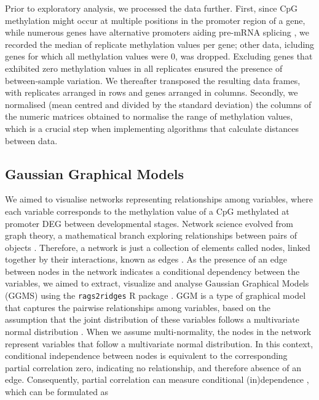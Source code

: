 \documentclass[
	a4paper, %
	10pt, %
	unnumberedsections, %
	twoside, %
]{LTJournalArticle}
\begin{document}
Prior to exploratory analysis, we processed the data further. 
First, since CpG methylation might occur at 
multiple positions in the promoter region of a gene, while numerous genes 
have alternative promoters aiding pre-mRNA splicing \autocite{xin2008a}, we 
recorded the median 
of replicate methylation values per gene; other data, icluding 
genes for which all methylation values were 0, was dropped. Excluding genes that 
exhibited zero methylation values in all replicates ensured the presence 
of between-sample variation. We thereafter 
transposed the resulting data frames, with replicates arranged in rows and 
genes arranged in columns. Secondly, we normalised (mean centred and divided by 
the standard deviation) the columns of the numeric matrices obtained to normalise the 
range of methylation values, which is a crucial step when implementing algorithms 
that calculate distances between data.                                                                                                                  

\subsection{\normalsize Gaussian Graphical Models}
We aimed to visualise networks representing relationships among variables, where 
each variable corresponds to the methylation value of a CpG 
methylated at promoter DEG between developmental stages. Network science 
evolved from graph theory, a mathematical branch exploring relationships 
between pairs of objects \autocite{i2020a}. Therefore, a network is just 
a collection of elements called nodes, linked together by their interactions, 
known as edges \autocite{hastie2009a}. As the presence of an edge between nodes in the network indicates 
a conditional dependency between the variables, we aimed to extract, 
visualize and analyse Gaussian Graphical Models (GGMS) 
using the \texttt{rags2ridges} R package \autocite{peeters2022a}.
GGM is a type of graphical model that captures the pairwise 
relationships among variables, 
based on the assumption that the joint distribution of these variables 
follows a multivariate normal distribution 
\autocite{altenbuchinger2020a}. When we assume multi-normality, 
the nodes in the 
network represent variables that follow a multivariate normal distribution. 
In this context, conditional independence 
between nodes is equivalent to the corresponding partial correlation zero, 
indicating no relationship, and therefore absence of an edge. Consequently,
partial correlation can measure conditional (in)dependence \autocite{cai2022a}, 
which can be formulated as 
\end{document}
